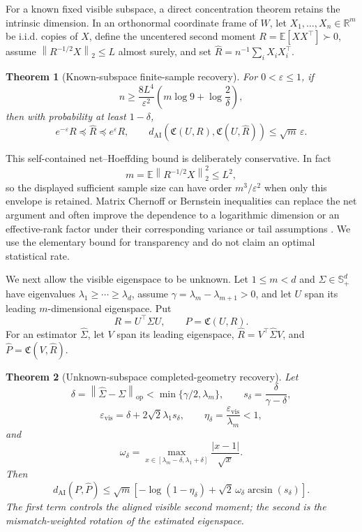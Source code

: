 \documentclass[10pt]{article}
\theoremstyle{plain}
\newtheorem{theorem}{Theorem}[section]
\theoremstyle{definition}
\theoremstyle{remark}
\newcommand{\R}{\mathbb R}
\newcommand{\E}{\mathbb E}
\newcommand{\PSD}{\mathbb S_{+}}
\newcommand{\AI}{\mathrm{AI}}
\newcommand{\opnorm}[1]{\left\lVert #1\right\rVert_{\operatorname{op}}}
\newcommand{\norm}[1]{\left\lVert #1\right\rVert}
\newcommand{\dai}{d_{\AI}}
\newcommand{\Cpl}{\mathfrak C}
\newcommand{\Rhat}{\widehat R}
\newcommand{\Phat}{\widehat P}
\newcommand{\Sigmahat}{\widehat\Sigma}
\begin{document}
For a known fixed visible subspace, a direct concentration theorem retains
the intrinsic dimension.  In an orthonormal coordinate frame of \(W\), let
\(X_1,\ldots,X_n\in\R^m\) be i.i.d. copies of \(X\), define the uncentered
second moment \(R=\E[XX^\top]\succ0\), assume
\(\norm{R^{-1/2}X}_2\le L\) almost surely, and set
\(\Rhat=n^{-1}\sum_iX_iX_i^\top\).

\begin{theorem}[Known-subspace finite-sample recovery]
\label{thm:known-subspace-recovery}
For \(0<\varepsilon\le1\), if
\begin{equation}
  n\ge
  \frac{8L^4}{\varepsilon^2}
  \left(m\log9+\log\frac{2}{\delta}\right),
  \label{eq:known-subspace-sample-size}
\end{equation}
then with probability at least \(1-\delta\),
\begin{equation}
  e^{-\varepsilon}R\preceq\Rhat\preceq e^\varepsilon R,
  \qquad
  \dai(\Cpl(U,R),\Cpl(U,\Rhat))\le\sqrt m\,\varepsilon.
  \label{eq:known-subspace-bound}
\end{equation}
\end{theorem}

This self-contained net--Hoeffding bound is deliberately conservative.  In
fact
\[
  m=\E\norm{R^{-1/2}X}_2^2\le L^2,
\]
so the displayed sufficient sample size can have order
\(m^3/\varepsilon^2\) when only this envelope is retained.  Matrix
Chernoff or Bernstein inequalities can replace the net argument and often
improve the dependence to a logarithmic dimension or an effective-rank
factor under their corresponding variance or tail assumptions
\citep{tropp2015matrix}.  We use the elementary bound for transparency and
do not claim an optimal statistical rate.

We next allow the visible eigenspace to be unknown.  Let \(1\le m<d\) and
\(\Sigma\in\PSD^d\) have eigenvalues
\(\lambda_1\ge\cdots\ge\lambda_d\), assume
\(\gamma=\lambda_m-\lambda_{m+1}>0\), and let \(U\) span its leading
\(m\)-dimensional eigenspace.  Put
\[
  R=U^\top\Sigma U,
  \qquad
  P=\Cpl(U,R).
\]
For an estimator \(\Sigmahat\), let \(V\) span its leading eigenspace,
\(\Rhat=V^\top\Sigmahat V\), and \(\Phat=\Cpl(V,\Rhat)\).

\begin{theorem}[Unknown-subspace completed-geometry recovery]
\label{thm:unknown-subspace-recovery}
Let
\[
  \delta=\opnorm{\Sigmahat-\Sigma}
  <\min\{\gamma/2,\lambda_m\},
  \qquad
  s_\delta=\frac{\delta}{\gamma-\delta},
\]
\[
  \varepsilon_{\mathrm{vis}}
  =\delta+2\sqrt2\lambda_1s_\delta,
  \qquad
  \eta_\delta=\frac{\varepsilon_{\mathrm{vis}}}{\lambda_m}<1,
\]
and
\[
  \omega_\delta
  =\max_{x\in[\lambda_m-\delta,\lambda_1+\delta]}
  \frac{|x-1|}{\sqrt x}.
\]
Then
\begin{equation}
  \boxed{
  \dai(P,\Phat)
  \le
  \sqrt m\left[-\log(1-\eta_\delta)
  +\sqrt2\,\omega_\delta\arcsin(s_\delta)\right].}
  \label{eq:unknown-subspace-bound}
\end{equation}
The first term controls the aligned visible second moment; the second is the
mismatch-weighted rotation of the estimated eigenspace.
\end{theorem}
\end{document}
